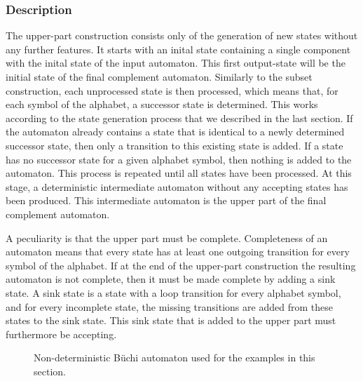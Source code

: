 \subsubsection{Description}
The upper-part construction consists only of the generation of new states without any further features. It starts with an inital state containing a single component with the inital state of the input automaton. This first output-state will be the initial state of the final complement automaton. Similarly to the subset construction, each unprocessed state is then processed, which means that, for each symbol of the alphabet, a successor state is determined. This works according to the state generation process that we described in the last section. If the automaton already contains a state that is identical to a newly determined successor state, then only a transition to this existing state is added. If a state has no successor state for a given alphabet symbol, then nothing is added to the automaton. This process is repeated until all states have been processed. At this stage, a deterministic intermediate automaton without any accepting states has been produced. This intermediate automaton is the upper part of the final complement automaton.

A peculiarity is that the upper part must be complete. Completeness of an automaton means that every state has at least one outgoing transition for every symbol of the alphabet. If at the end of the upper-part construction the resulting automaton is not complete, then it must be made complete by adding a sink state. A sink state is a state with a loop transition for every alphabet symbol, and for every incomplete state, the missing transitions are added from these states to the sink state. This sink state that is added to the upper part must furthermore be accepting.

\begin{figure}[htb]
\centering
\Automaton
\caption{Non-deterministic Büchi automaton used for the examples in this section.}
\label{ex_aut_2}
\end{figure}


